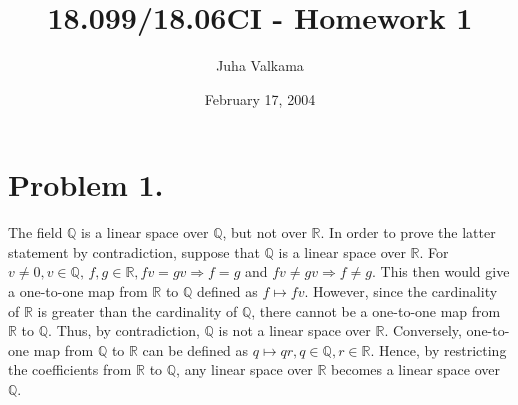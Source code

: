 \documentclass[11pt]{amsart}
\newcommand{\field}[1]{\mathbb{#1}}
\begin{document}
\title{18.099/18.06CI - Homework 1}
\author{Juha Valkama}
\date{February 17, 2004}
\maketitle

\section*{Problem 1.}
The field $\field{Q}$ is a linear space over $\field{Q}$, but not over
$\field{R}$. In order to prove the latter statement by contradiction,
suppose that $\field{Q}$ is a linear space over $\field{R}$. For
$v\not=0,v \in \field{Q},\, f, g \in \field{R}, fv=gv \Rightarrow f=g$
and $fv \not = gv \Rightarrow f \not = g.$ This then would give a
one-to-one map from $\field{R}$ to $\field{Q}$ defined as $f \mapsto
fv$.  However, since the cardinality of $\field{R}$ is greater than
the cardinality of $\field{Q}$, there cannot be a one-to-one map from
$\field{R}$ to $\field{Q}$. Thus, by contradiction, $\field{Q}$ is not
a linear space over $\field{R}$. Conversely, one-to-one map from
$\field{Q}$ to $\field{R}$ can be defined as $q \mapsto qr, q \in
\field{Q}, r \in \field{R}$. Hence, by restricting the coefficients
from $\field{R}$ to $\field{Q}$, any linear space over $\field{R}$
becomes a linear space over $\field{Q}$.
\end{document}
